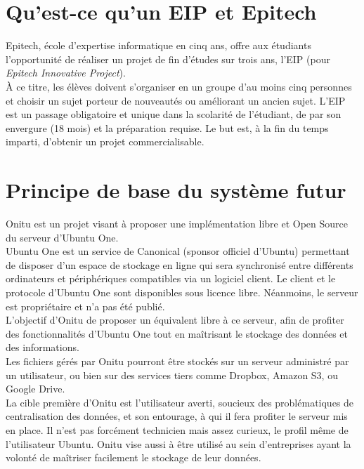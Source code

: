 \section{Qu'est-ce qu'un EIP et Epitech}
Epitech, école d'expertise informatique en cinq ans, offre aux étudiants l'opportunité de réaliser un projet de fin d'études sur trois ans, l'EIP (pour \emph{Epitech Innovative Project}).\\

À ce titre, les élèves doivent s'organiser en un groupe d'au moins cinq personnes et choisir un sujet porteur de nouveautés ou améliorant un ancien sujet. L'EIP est un passage obligatoire et unique dans la scolarité de l'étudiant, de par son envergure (18 mois) et la préparation requise. Le but est, à la fin du temps imparti, d'obtenir un projet commercialisable.


\section{Principe de base du système futur}
    Onitu est un projet visant à proposer une implémentation libre et Open Source du serveur d’Ubuntu One.\\

    Ubuntu One est un service de Canonical (sponsor officiel d'Ubuntu) permettant de disposer d’un espace de stockage en ligne qui sera synchronisé entre différents ordinateurs et périphériques compatibles via un logiciel client. Le client et le protocole d’Ubuntu One sont disponibles sous licence libre. Néanmoins, le serveur est propriétaire et n’a pas été publié.\\

    L'objectif d'Onitu de proposer un équivalent libre à ce serveur, afin de profiter des fonctionnalités d’Ubuntu One tout en maîtrisant le stockage des données et des informations.\\

    Les fichiers gérés par Onitu pourront être stockés sur un serveur administré par un utilisateur, ou bien sur des services tiers comme Dropbox, Amazon S3, ou Google Drive.\\

    La cible première d'Onitu est l'utilisateur averti, soucieux des problématiques de centralisation des données, et son entourage, à qui il fera profiter le serveur mis en place. Il n'est pas forcément technicien mais assez curieux, le profil même de l'utilisateur Ubuntu.
    Onitu vise aussi à être utilisé au sein d'entreprises ayant la volonté de maîtriser facilement le stockage de leur données.\\
